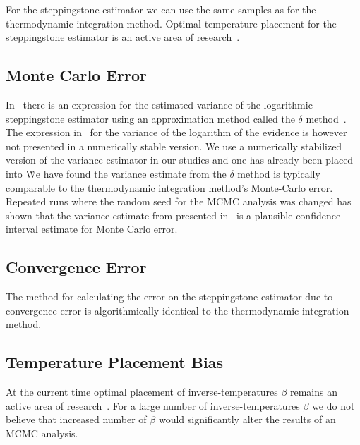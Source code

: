 For the steppingstone estimator we can use the same samples as for the thermodynamic integration method. Optimal temperature placement for the steppingstone estimator is an active area of research~\citep{annis2019thermodynamic}.

\subsection{Monte Carlo Error}
In~\cite{xie2010improving} there is an expression for the estimated variance of the logarithmic steppingstone estimator using an approximation method called the $\delta$ method~\citep{oehlert1992note}. The expression in~\cite{xie2010improving} for the variance of the logarithm of the evidence is however not presented in a numerically stable version. We use a numerically stabilized version of the variance estimator in our studies and one has already been placed into \pycbc{}\. We have found the variance estimate from the $\delta$ method is typically comparable to the thermodynamic integration method's Monte-Carlo error. Repeated runs where the random seed for the MCMC analysis was changed has shown that the variance estimate from presented in~\cite{xie2010improving} is a plausible confidence interval estimate for Monte Carlo error.  

\subsection{Convergence Error}
The method for calculating the error on the steppingstone estimator due to convergence error is algorithmically identical to the thermodynamic integration method.

\subsection{Temperature Placement Bias}
At the current time optimal placement of inverse-temperatures $\beta$ remains an active area of research~\citep{annis2019thermodynamic}. For a large number of inverse-temperatures $\beta$ we do not believe that increased number of $\beta$ would significantly alter the results of an MCMC analysis.

